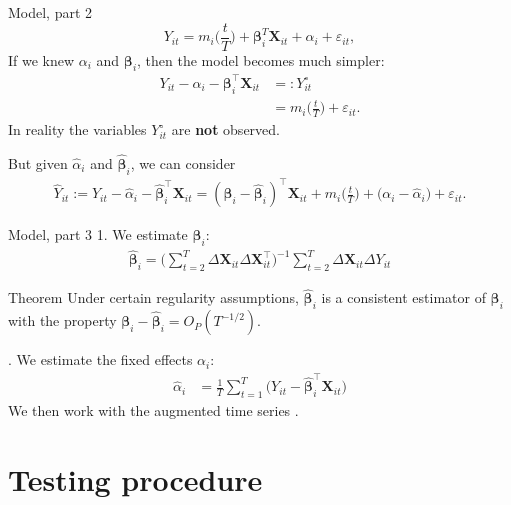 \documentclass[10pt]{beamer}
\newcommand{\X}{\boldsymbol{X}}
\newcommand{\bfbeta}{\boldsymbol{\beta}}
\begin{document}
\begin{frame}{Model, part 2}
\begin{equation*}
Y_{it} = m_i \Big( \frac{t}{T} \Big) + \bfbeta_i^T\X_{it}+ \alpha_i + \varepsilon_{it},
\end{equation*}\pause
If we knew $\alpha_i$ and $\bfbeta_i$, then the model becomes much simpler:
\begin{align*}
Y_{it} - \alpha_i - \bfbeta_i^\top \X_{it} & =: Y_{it}^\circ\\
					& = m_i \Big( \frac{t}{T} \Big) + \varepsilon_{it}. 
\end{align*}\pause
In reality the variables $Y_{it}^\circ$ are \textbf{not} observed. \pause

But given $\widehat{\alpha}_i$ and $\widehat{\bfbeta}_i$, we can consider
\begin{align*}
	\widehat{Y}_{it} := Y_{it} -\widehat{\alpha}_i - \widehat{\bfbeta}_i^\top \X_{it} =(\bfbeta_i - \widehat{\bfbeta}_i)^\top \X_{it} + m_i \Big( \frac{t}{T} \Big) + \big( \alpha_i - \widehat{\alpha}_i \big) + \varepsilon_{it}. 
\end{align*}
\end{frame}


\begin{frame}{Model, part 3}
1. We estimate $\bfbeta_i$:
\begin{align*}
\widehat{\bfbeta}_i = \Big( \sum_{t=2}^T \Delta \X_{it} \Delta \X_{it}^\top \Big)^{-1} \sum_{t=2}^T \Delta \X_{it} \Delta Y_{it}
\end{align*}\pause
\vspace{-3mm}
\begin{block}{Theorem}
Under certain regularity assumptions, $\widehat{\bfbeta}_i$ is a consistent estimator of $\bfbeta_i$ with the property $\bfbeta_i - \widehat{\bfbeta}_i = O_P(T^{-1/2})$.
\end{block}. We estimate the fixed effects $\alpha_i$:
\begin{align*}
\widehat{\alpha}_i &= \frac{1}{T}\sum_{t=1}^T \big(Y_{it} - \widehat{\bfbeta}_i^\top \X_{it}\big)
\end{align*}\pause
We then work with the augmented time series \color{mLightBrown}{$\widehat{Y}_{it} = Y_{it} - \widehat{\alpha}_i - \widehat{\bfbeta}_i^\top \X_{it}$}.
\end{frame}

\section{Testing procedure}
\end{document}
